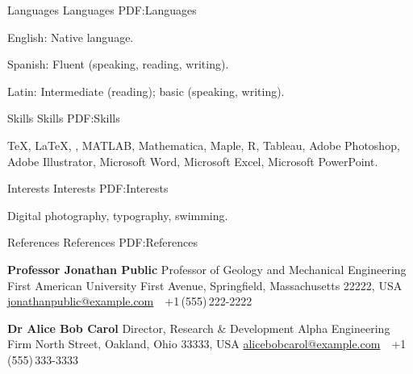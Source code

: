 \documentclass[letterpaper,MMMyyyy,nonstopmode]{simpleresumecv}
\begin{document}
\begin{Body}

\Section
{Languages}
{Languages}
{PDF:Languages}

\BulletItem
English: Native language.

\Gap
\BulletItem
Spanish: Fluent (speaking, reading, writing).

\Gap
\BulletItem
Latin: Intermediate (reading); basic (speaking, writing).


\Section
{Skills}
{Skills}
{PDF:Skills}

\Entry
{\TeX}, {\LaTeX}, {\XeLaTeX},
MATLAB,
Mathematica,
Maple,
R,
Tableau,
Adobe Photoshop,
Adobe Illustrator,
Microsoft Word,
Microsoft Excel,
Microsoft PowerPoint.


\Section
{Interests}
{Interests}
{PDF:Interests}

\Entry
Digital photography,
typography,
swimming.


\Section
{References}
{References}
{PDF:References}

\BulletItem
\textbf{Professor Jonathan Public}
\newline
Professor of Geology and Mechanical Engineering
\newline
First American University
 First Avenue, Springfield, Massachusetts 22222, USA
\newline
\href{mailto:jonathanpublic@example.com}
{jonathanpublic@example.com}
\,\SubBulletSymbol\,
+1\,(555)\,222-2222

\BigGap
\BulletItem
\textbf{Dr Alice Bob Carol}
\newline
Director, Research \& Development
\newline
Alpha Engineering Firm
 North Street, Oakland, Ohio 33333, USA
\newline
\href{mailto:alicebobcarol@example.com}
{alicebobcarol@example.com}
\,\SubBulletSymbol\,
+1\,(555)\,333-3333

\end{Body}

\BigGap
\UseNoteFont%
\null\hfill%
\end{document}

